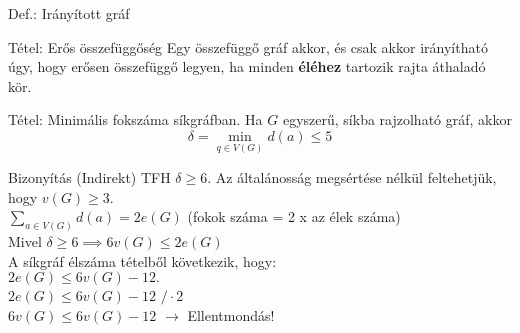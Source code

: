 \documentclass{beamer}
\begin{document}
\begin{frame}
\begin{block}{Def.: Irányított gráf}

\end{block}
\end{frame}

\begin{frame}
\begin{block}{Tétel: Erős összefüggőség}
Egy összefüggő gráf akkor, és csak akkor irányítható úgy, hogy erősen összefüggő legyen, ha minden \textbf{éléhez} tartozik rajta áthaladó kör.
\end{block}
\end{frame}

\begin{frame}
\begin{block}{Tétel: Minimális fokszáma síkgráfban.}
Ha $G$ egyszerű, síkba rajzolható gráf, akkor $$\delta = \min_{{q \in V(G)}} d(a) \leq 5$$

\end{block}

\begin{block}{Bizonyítás (Indirekt)}
TFH $\delta \geq 6$.
Az általánosság megsértése nélkül feltehetjük, hogy $v(G) \geq 3$.\\
$\sum_{{a \in V(G)}} d(a) = 2e(G)$ (fokok száma = 2 x az élek száma)\\
Mivel $\delta \geq 6 \implies 6v(G) \leq 2e(G)$\\
A síkgráf élszáma tételből következik, hogy:\\
$2e(G) \leq 6v(G) - 12.$\\
\bigskip
$2e(G) \leq 6v(G) - 12$ \hspace{1ex} $/\cdot2$\\
$6v(G) \leq 6v(G) - 12$ $\rightarrow$ Ellentmondás!

\end{block}

\end{frame}
\end{document}
